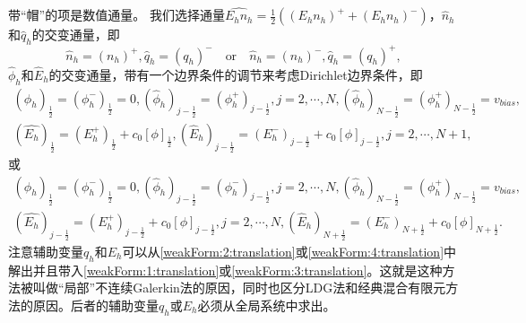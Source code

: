 带“帽”的项是数值通量。 我们选择通量$\hat{E_h n_h} = \frac{1}{2}((E_hn_h)^+  + (E_hn_h)^-)$，$\hat{n}_h$和$\hat{q}_h$的交变通量，即
\begin{equation}
    \hat{n}_h = (n_h)^+, \hat{q}_h = (q_h)^- \quad \text{or} \quad \hat{n}_h = (n_h)^-, \hat{q}_h = (q_h)^+, \label{numbericalFlux:n&q:translation}
\end{equation}
$\hat{\phi}_h$和$\hat{E}_h$的交变通量，带有一个边界条件的调节来考虑Dirichlet边界条件，即
\begin{equation}
    \begin{aligned}
        (\hat{\phi}_h)_{\frac{1}{2}} = (\phi_h^-)_{\frac{1}{2}} = 0, (\hat{\phi}_h)_{j-\frac{1}{2}} = (\phi_h^+)_{j-\frac{1}{2}},j = 2,\cdots,N,(\hat{\phi}_h)_{N-\frac{1}{2}} = (\phi_h^+)_{N-\frac{1}{2}} = v_{bias}, \\
        (\hat{E_h})_{\frac{1}{2}} = (E_h^+)_{\frac{1}{2}} + c_0[\phi]_{\frac{1}{2}}, (\hat{E}_h)_{j-\frac{1}{2}} = (E_h^-)_{j-\frac{1}{2}} + c_0[\phi]_{j-\frac{1}{2}},j = 2,\cdots,N+1,
    \end{aligned}\label{numbericalFlux:phi&E:translation}
\end{equation}
或
\begin{equation}
    \begin{aligned}
        (\hat{\phi}_h)_{\frac{1}{2}} = (\phi_h^-)_{\frac{1}{2}} = 0, (\hat{\phi}_h)_{j-\frac{1}{2}} = (\phi_h^-)_{j-\frac{1}{2}},j = 2,\cdots,N,(\hat{\phi}_h)_{N-\frac{1}{2}} = (\phi_h^+)_{N-\frac{1}{2}} = v_{bias}, \\
        (\hat{E_h})_{j - \frac{1}{2}} = (E_h^+)_{j - \frac{1}{2}} + c_0[\phi]_{j-\frac{1}{2}},j = 2,\cdots,N, (\hat{E}_h)_{N+\frac{1}{2}} = (E_h^-)_{N+\frac{1}{2}} + c_0[\phi]_{N+\frac{1}{2}}.
    \end{aligned}\label{numbericalFlux:phi&E alt:translation}
\end{equation}
注意辅助变量$q_h$和$E_h$可以从\eqref{weakForm:2:translation}或\eqref{weakForm:4:translation}中解出并且带入\eqref{weakForm:1:translation}或\eqref{weakForm:3:translation}。这就是这种方法被叫做“局部”不连续Galerkin法的原因，同时也区分LDG法和经典混合有限元方法的原因。后者的辅助变量$q_h$或$E_h$必须从全局系统中求出。

